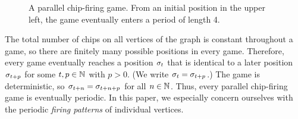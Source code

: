 \begin{centering}
\begin{figure}[h]
\caption{A parallel chip-firing game. From an initial position in the upper
  left, the game eventually enters a period of length 4.}
\label{example}
\end{figure}
\end{centering}

The total number of chips on all vertices of the graph is constant throughout a
game, so there are finitely many possible positions in every game. Therefore,
every game eventually reaches a position $\sigma_{t}$ that is identical to a later
position $\sigma_{t+p}$ for some $t,p \in \mathbb{N}$ with $p > 0$. (We write $\sigma_{t}
= \sigma_{t+p}$.) The game is deterministic, so $\sigma_{t+n} = \sigma_{t+n+p}$ for all
$n \in \mathbb{N}$. Thus, every parallel chip-firing game is eventually periodic.
In this paper, we especially concern ourselves with the periodic \emph{firing
  patterns} of individual vertices.

